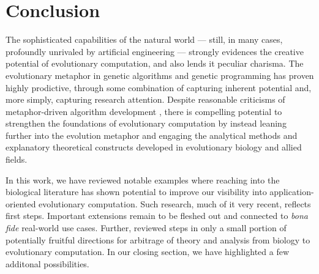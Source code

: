 
\section{Conclusion} \label{sec:conclusion}

The sophisticated capabilities of the natural world --- still, in many cases, profoundly unrivaled by artificial engineering --- strongly evidences the creative potential of evolutionary computation, and also lends it peculiar charisma.
The evolutionary metaphor in genetic algorithms and genetic programming has proven highly prodictive, through some combination of capturing inherent potential and, more simply, capturing research attention.
Despite reasonable criticisms of metaphor-driven algorithm development , there is compelling potential to strengthen the foundations of evolutionary computation by instead leaning further into the evolution metaphor and engaging the analytical methods and explanatory theoretical constructs developed in evolutionary biology and allied fields.

In this work, we have reviewed notable examples where reaching into the biological literature has shown potential to improve our visibility into application-oriented evolutionary computation.
Such research, much of it very recent, reflects first steps.
Important extensions remain to be fleshed out and connected to \textit{bona fide} real-world use cases.
Further, reviewed steps in only a small portion of potentially fruitful directions for arbitrage of theory and analysis from biology to evolutionary computation.
In our closing section, we have highlighted a few additonal possibilities.


